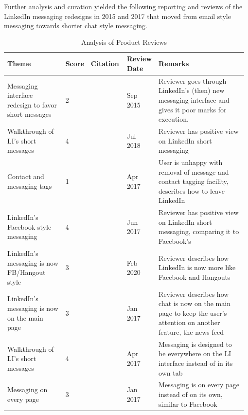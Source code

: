 \documentclass[
	letterpaper, %
]{jdf}
\begin{document}
Further analysis and curation yielded the following reporting and reviews of the LinkedIn messaging redesigns in 2015 and 2017 that moved from email style messaging towards shorter chat style messaging.

\begin{table}[h] %
	\caption{Analysis of Product Reviews}
	\small %
	\centering %
	\begin{tabular}{L{0.25\linewidth} C{0.05\linewidth} L{0.15\linewidth} L{0.13\linewidth}  L{0.4\linewidth}}
		\textbf{Theme} & \textbf{Score} & \textbf{Citation} & \textbf{Review Date} & \textbf{Remarks}\\
		\toprule[0.5pt]
		Messaging interface redesign to favor short messages & 2 & \cite{hull_2015} & Sep 2015 & Reviewer goes through LinkedIn's (then) new messaging interface and gives it poor marks for execution.\\
		\midrule
		Walkthrough of LI's short messages & 4 & \cite{simos_2018} & Jul 2018 & Reviewer has positive view on LinkedIn short messaging\\
		\midrule
		Contact and messaging tags & 1 & \cite{driskell_2017} & Apr 2017 & User is unhappy with removal of message and contact tagging facility, describes how to leave LinkedIn\\
		\midrule
		LinkedIn's Facebook style messaging & 4 & \cite{gonzalez_2017} & Jun 2017 & Reviewer has positive view on LinkedIn short messaging, comparing it to Facebook's\\
		\midrule
		LinkedIn's messaging is now FB/Hangout style & 3 & \cite{ingraham_2020} & Feb 2020 & Reviewer describes how LinkedIn is now more like Facebook and Hangouts\\
		\midrule
		LinkedIn's messaging is now on the main page & 3 & \cite{lunden_2017} & Jan 2017 & Reviewer describes how chat is now on the main page to keep the user's attention on another feature, the news feed\\
		\midrule
		Walkthrough of LI's short messages & 4 & \cite{price_2017} & Apr 2017 & Messaging is designed to be everywhere on the LI interface instead of in its own tab\\
		\midrule
		Messaging on every page & 3 & \cite{warren_2017} & Jan 2017 & Messaging is on every page instead of on its own, similar to Facebook\\
		\midrule
		
	\end{tabular}
\end{table}
\end{document}
